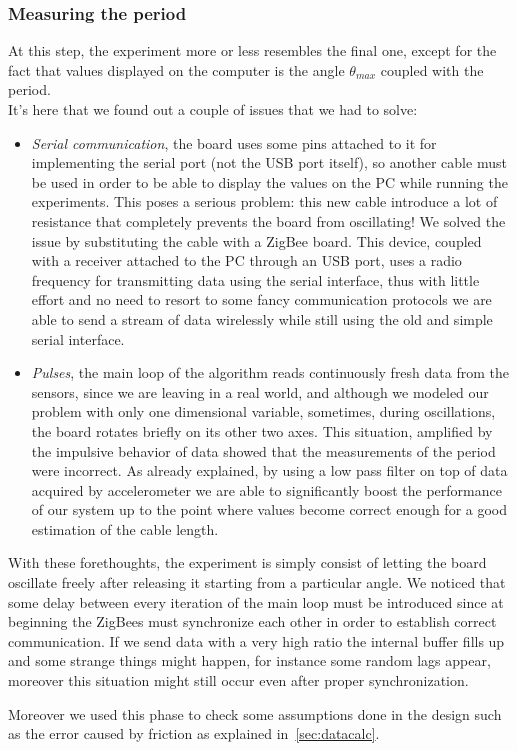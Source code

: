 \subsubsection{Measuring the period}
At this step, the experiment more or less resembles the final one, except for the fact that values displayed on the computer is the angle $\theta_{max}$ coupled with the period. \\
It's here that we found out a couple of issues that we had to solve:
\begin{itemize}
	\item \textit{Serial communication}, the board uses some pins attached to it for implementing the serial port (not the USB port itself), so another cable must be used in order to be able to display the values on the PC while running the experiments. This poses a serious problem: this new cable introduce a lot of resistance that completely prevents the board from oscillating! We solved the issue by substituting the cable with a ZigBee board. This device, coupled with a receiver attached to the PC through an USB port, uses a radio frequency for transmitting data using the serial interface, thus with little effort and no need to resort to some fancy communication protocols we are able to send a stream of data wirelessly while still using the old and simple serial interface.
	\item \textit{Pulses}, the main loop of the algorithm reads continuously fresh data from the sensors, since we are leaving in a real world, and although we modeled our problem with only one dimensional variable, sometimes, during oscillations, the board rotates briefly on its other two axes. This situation, amplified by the impulsive behavior of data showed that the measurements of the period were incorrect. As already explained, by using a low pass filter on top of data acquired by accelerometer we are able to significantly boost the performance of our system up to the point where values become correct enough for a good estimation of the cable length.
\end{itemize}
With these forethoughts, the experiment is simply consist of letting the board oscillate freely after releasing it starting from a particular angle. We noticed that some delay between every iteration of the main loop must be introduced since at beginning the ZigBees must synchronize each other in order to establish correct communication. If we send data with a very high ratio the internal buffer fills up and some strange things might happen, for instance some random lags appear, moreover this situation might still occur even after proper synchronization.\par
Moreover we used this phase to check some assumptions done in the design such as the error caused by friction as explained in~\ref{sec:datacalc}.

